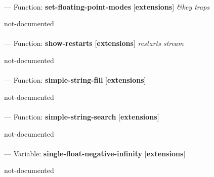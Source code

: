 \paragraph{}
\label{EXTENSIONS:SET-FLOATING-POINT-MODES}
--- Function: \textbf{set-floating-point-modes} [\textbf{extensions}] \textit{\&key traps}

\begin{adjustwidth}{5em}{5em}
not-documented
\end{adjustwidth}

\paragraph{}
\label{EXTENSIONS:SHOW-RESTARTS}
--- Function: \textbf{show-restarts} [\textbf{extensions}] \textit{restarts stream}

\begin{adjustwidth}{5em}{5em}
not-documented
\end{adjustwidth}

\paragraph{}
\label{EXTENSIONS:SIMPLE-STRING-FILL}
--- Function: \textbf{simple-string-fill} [\textbf{extensions}] \textit{}

\begin{adjustwidth}{5em}{5em}
not-documented
\end{adjustwidth}

\paragraph{}
\label{EXTENSIONS:SIMPLE-STRING-SEARCH}
--- Function: \textbf{simple-string-search} [\textbf{extensions}] \textit{}

\begin{adjustwidth}{5em}{5em}
not-documented
\end{adjustwidth}

\paragraph{}
\label{EXTENSIONS:SINGLE-FLOAT-NEGATIVE-INFINITY}
--- Variable: \textbf{single-float-negative-infinity} [\textbf{extensions}] \textit{}

\begin{adjustwidth}{5em}{5em}
not-documented
\end{adjustwidth}


